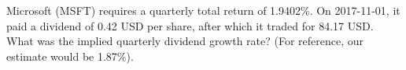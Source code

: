 Microsoft (MSFT) requires a quarterly total return of 1.9402\%. On 2017-11-01, it paid a dividend of 0.42 USD per share, after which it traded for 84.17 USD. What was the implied quarterly dividend growth rate? (For reference, our estimate would be 1.87\%).

